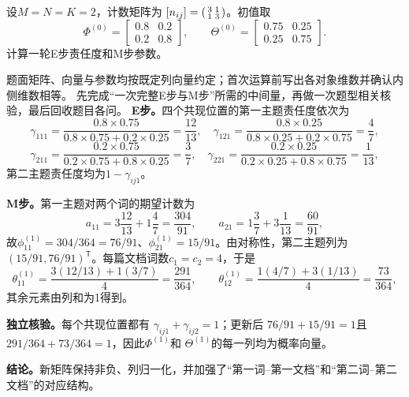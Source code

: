 \label{struct:V4-C06-CH32}
\begin{example}[一次完整E步与M步]\label{exm:V4-C06-one-em}
设$M=N=K=2$，计数矩阵为
$[n_{ij}]=\begin{psmallmatrix}3&1\\1&3\end{psmallmatrix}$。初值取
\[
\Phi^{(0)}=\begin{bmatrix}0.8&0.2\\0.2&0.8\end{bmatrix},\qquad
\Theta^{(0)}=\begin{bmatrix}0.75&0.25\\0.25&0.75\end{bmatrix}.
\]
计算一轮E步责任度和M步参数。

\label{struct:V4-C06-CH33}
\end{example}
\begin{solution}
\SolGiven 题面矩阵、向量与参数均按既定列向量约定；首次运算前写出各对象维数并确认内侧维数相等。
\SolPlan 先完成“一次完整E步与M步”所需的中间量，再做一次题型相关核验，最后回收题目各问。
\SolDerive
\textbf{E步。}四个共现位置的第一主题责任度依次为
\[
\gamma_{111}=\frac{0.8\times0.75}{0.8\times0.75+0.2\times0.25}=\frac{12}{13},
\quad
\gamma_{121}=\frac{0.8\times0.25}{0.8\times0.25+0.2\times0.75}=\frac47,
\]
\[
\gamma_{211}=\frac{0.2\times0.75}{0.2\times0.75+0.8\times0.25}=\frac37,
\quad
\gamma_{221}=\frac{0.2\times0.25}{0.2\times0.25+0.8\times0.75}=\frac1{13},
\]
第二主题责任度均为$1-\gamma_{ij1}$。

\textbf{M步。}第一主题对两个词的期望计数为
\[
a_{11}=3\frac{12}{13}+1\frac47=\frac{304}{91},\qquad
a_{21}=1\frac37+3\frac1{13}=\frac{60}{91},
\]
故$\phi_{11}^{(1)}=304/364=76/91$、$\phi_{21}^{(1)}=15/91$。由对称性，第二主题列为$(15/91,76/91)^{\mathsf T}$。每篇文档词数$c_1=c_2=4$，于是
\[
\theta_{11}^{(1)}=\frac{3(12/13)+1(3/7)}4=\frac{291}{364},
\qquad
\theta_{12}^{(1)}=\frac{1(4/7)+3(1/13)}4=\frac{73}{364},
\]
其余元素由列和为1得到。

\textbf{独立核验。}每个共现位置都有
$\gamma_{ij1}+\gamma_{ij2}=1$；更新后
$76/91+15/91=1$且$291/364+73/364=1$，因此$\Phi^{(1)}$和
$\Theta^{(1)}$的每一列均为概率向量。

\textbf{结论。}新矩阵保持非负、列归一化，并加强了“第一词--第一文档”和“第二词--第二文档”的对应结构。
\end{solution}

